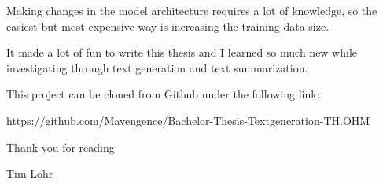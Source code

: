 Making changes in the model architecture requires a lot of knowledge, so the easiest but most expensive way is increasing the training data size. 

It made a lot of fun to write this thesis and I learned so much new while investigating through text generation and text summarization.

This project can be cloned from Github under the following link:

\begin{tcolorbox}
	https://github.com/Mavengence/Bachelor-Thesis-Textgeneration-TH.OHM
\end{tcolorbox}

Thank you for reading

Tim Löhr